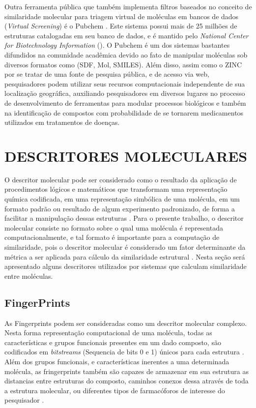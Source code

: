 Outra ferramenta pública que também implementa filtros baseados no conceito de similaridade molecular para triagem virtual de moléculas em bancos de dados (\textit{Virtual Screening})   é o Pubchem \cite{li2010pubchem}. Este sistema possui mais de 25 milhões de estruturas catalogadas em seu banco de dados, e é mantido pelo \textit{National Center for Biotechnology Information} (). O Pubchem é um dos sistemas bastantes difundidos na comunidade acadêmica devido ao fato de manipular moléculas sob diversos formatos como (SDF, Mol, SMILES). Além disso, assim como o ZINC \cite{irwin2005zinc} por se tratar de uma fonte de pesquisa pública, e de acesso via web, pesquisadores podem utilizar seus recursos computacionais independente de sua localização geográfica, auxiliando pesquisadores em diversos lugares no processo de desenvolvimento de ferramentas para modular processos biológicos e também na identificação de compostos com probabilidade de se tornarem medicamentos utilizados em tratamentos de doenças.   

\section{DESCRITORES MOLECULARES}
O descritor molecular pode ser considerado como o resultado da aplicação de procedimentos lógicos e matemáticos que transformam uma representação química codificada, em uma representação simbólica de uma molécula, em um formato padrão ou resultado de algum experimento padronizado, de forma a facilitar a manipulação dessas estruturas \cite{todeschini2008handbook}. Para o presente trabalho, o descritor molecular consiste no formato sobre o qual uma molécula é representada computacionalmente, e tal formato é importante para a computação de
similaridade, pois o descritor molecular é considerado um fator determinante da métrica a ser
aplicada para cálculo da similaridade estrutural \cite{todeschini2008handbook}. Nesta seção será apresentado alguns
descritores utilizados por sistemas que calculam similaridade entre moléculas.

\subsection{FingerPrints}
As Fingerprints podem ser consideradas como um descritor molecular complexo. Nesta forma representação computacional de uma molécula, todas as características e grupos funcionais presentes em um dado composto, são codificados em \textit{bitstreams} (Sequencia de bits 0 e 1) únicos para cada estrutura \cite{xue2000molecular}. Além dos grupos funcionais, e características inerentes a uma determinada molécula, as fringerprints também são capazes de armazenar em sua estrutura as distancias entre estruturas do composto, caminhos conexos dessa através de toda a estrutura molecular, ou diferentes tipos de farmacóforos de interesse do pesquisador \cite{todeschini2008handbook}.

